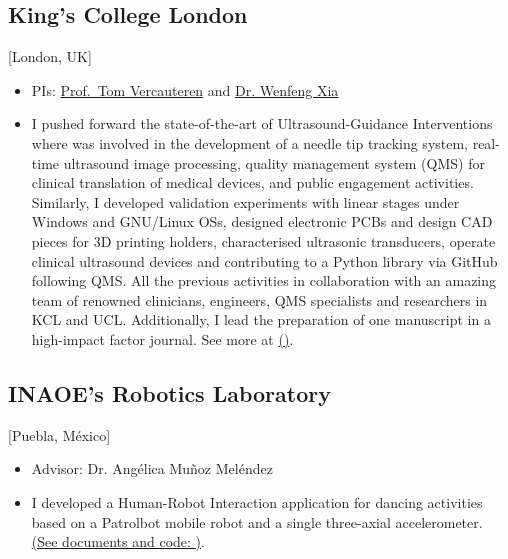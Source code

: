 \documentclass{mycv}
\begin{document}
\subsection{King's College London}[London, UK]
\begin{positions}
\end{positions}
\begin{itemize}
  \item PIs: \href{https://cai4cai.ml}{Prof.~Tom Vercauteren} and  \href{https://www.purlkcl.org/}{Dr. Wenfeng Xia} 
  \item I pushed forward the state-of-the-art of Ultrasound-Guidance Interventions
	where was involved in the development of a needle tip tracking system, real-time ultrasound image processing, 
	quality management system (QMS) for clinical translation of medical devices, and public engagement activities.
	Similarly, I developed validation experiments with linear stages under Windows and GNU/Linux OSs,
	designed electronic PCBs and design CAD pieces for 3D printing holders, characterised ultrasonic transducers,
    operate clinical ultrasound devices and contributing to a Python library via GitHub following QMS.
	All the previous activities in collaboration with an amazing 
	team of renowned clinicians, engineers, QMS specialists and researchers in KCL and UCL.
	Additionally, I lead the preparation of one manuscript in a high-impact factor journal.
	See more at \href{https://cai4cai.ml/author/miguel-xochicale/}{(\faExternalLink)}.
\end{itemize}


\subsection{INAOE's Robotics Laboratory}[Puebla, M\'exico]
\begin{positions}
\end{positions}
\begin{itemize}
  \item Advisor: Dr. Ang\'elica Mu\~noz Mel\'endez
  \item I developed a Human-Robot Interaction application for dancing activities based on 
a Patrolbot mobile robot and a single three-axial accelerometer. 
\href{https://sites.google.com/site/perezxochicale/projects/demodance}{(See documents and code: \faExternalLink)}.
\end{itemize}
\end{document}
